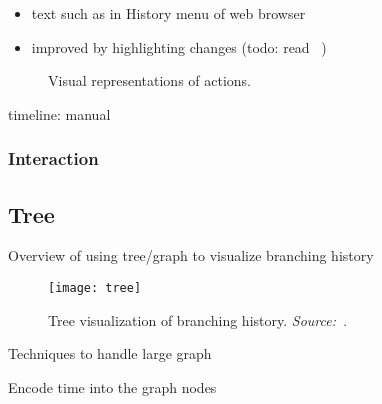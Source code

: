 \begin{itemize}
	\item text such as in History menu of web browser
	\item improved by highlighting changes (todo: read ~\cite{Waterson2002})
\end{itemize}

\begin{figure}[!htb]
\centering
{}
\caption{Visual representations of actions.}
\end{figure}

timeline: manual 

\subsubsection{Interaction}

\subsection{Tree}
Overview of using tree/graph to visualize branching history

\begin{figure}[!htb]
	\centering
	\texttt{[image: tree]}
	\caption{Tree visualization of branching history. \emph{Source:~\cite{Jankun-Kelly2007}}.}
	\label{fig:lr-tree}
\end{figure}

Techniques to handle large graph

Encode time into the graph nodes


